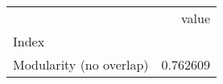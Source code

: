 \begin{tabular}{lr}
\toprule
{} &     value \\
Index                   &           \\
\midrule
Modularity (no overlap) &  0.762609 \\
\bottomrule
\end{tabular}
